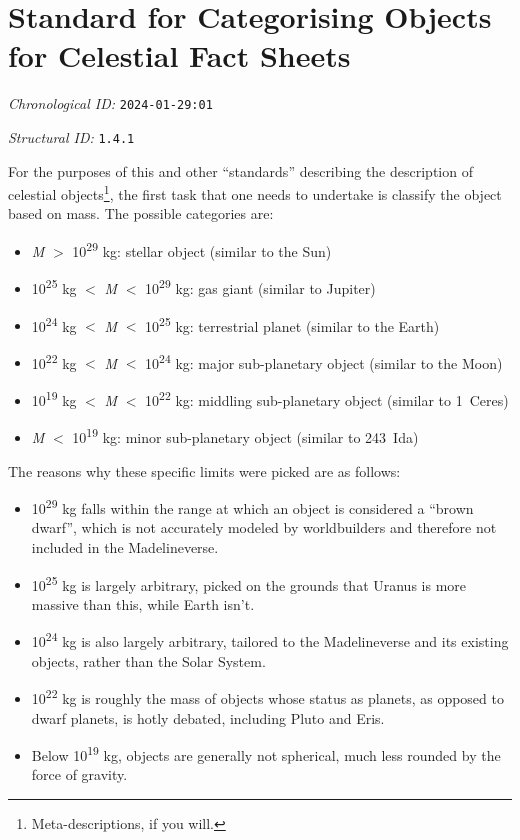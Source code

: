 \section{Standard for Categorising Objects for Celestial Fact Sheets}
\emph{Chronological ID:} \texttt{2024-01-29:01}

\emph{Structural ID:} \texttt{1.4.1}

For the purposes of this and other ``standards'' describing the description of celestial objects\footnote{Meta-descriptions, if you will.}, the first task that one needs to undertake is classify the object based on mass. The possible categories are:

\begin{itemize}
  \item \emph{M} $>$ 10\textsuperscript{29} kg: stellar object (similar to the Sun)
  \item 10\textsuperscript{25} kg $<$ \emph{M} $<$ 10\textsuperscript{29} kg: gas giant (similar to Jupiter)
  \item 10\textsuperscript{24} kg $<$ \emph{M} $<$ 10\textsuperscript{25} kg: terrestrial planet (similar to the Earth)
  \item 10\textsuperscript{22} kg $<$ \emph{M} $<$ 10\textsuperscript{24} kg: major sub-planetary object (similar to the Moon)
  \item 10\textsuperscript{19} kg $<$ \emph{M} $<$ 10\textsuperscript{22} kg: middling sub-planetary object (similar to 1~Ceres)
  \item \emph{M} $<$ 10\textsuperscript{19} kg: minor sub-planetary object (similar to 243~Ida)
\end{itemize}

The reasons why these specific limits were picked are as follows:

\begin{itemize}
  \item 10\textsuperscript{29} kg falls within the range at which an object is considered a ``brown dwarf'', which is not accurately modeled by worldbuilders and therefore not included in the Madelineverse.
  \item 10\textsuperscript{25} kg is largely arbitrary, picked on the grounds that Uranus is more massive than this, while Earth isn't.
  \item 10\textsuperscript{24} kg is also largely arbitrary, tailored to the Madelineverse and its existing objects, rather than the Solar System.
  \item 10\textsuperscript{22} kg is roughly the mass of objects whose status as planets, as opposed to dwarf planets, is hotly debated, including Pluto and Eris.
  \item Below 10\textsuperscript{19} kg, objects are generally not spherical, much less rounded by the force of gravity.
\end{itemize}
\newpage
